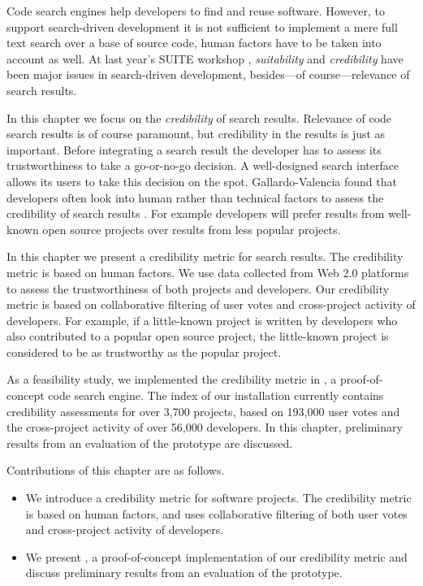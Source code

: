 Code search engines help developers to find and reuse software. However, to support search-driven development it is not sufficient to implement a mere full text search over a base of source code, human factors have to be taken into account as well. At last year's SUITE workshop \cite{Kuhn09a}, \emph{suitability} and \emph{credibility} have been major issues in search-driven development, besides---of course---relevance of search results.  

In this chapter we focus on the \emph{credibility} of search results. Relevance of code search results is of course paramount, but credibility in the results is just as important. Before integrating a search result the developer has to assess its trustworthiness to take a go-or-no-go decision. A well-designed search interface allows its users to take this decision on the spot. Gallardo-Valencia \etal found that developers often look into human rather than technical factors to assess the credibility of search results \cite{Gall09a}. For example developers will prefer results from well-known open source projects over results from less popular projects.

In this chapter we present a credibility metric for search results. The credibility metric is based on human factors. We use data collected from Web 2.0 platforms to assess the trustworthiness of both projects and developers. Our credibility metric is based on collaborative filtering of user votes and cross-project activity of developers. For example, if a little-known project is written by developers who also contributed to a popular open source project, the little-known project is considered to be as trustworthy as the popular project. 

As a feasibility study, we implemented the credibility metric in \Jbd, a proof-of-concept code search engine. The index of our \Jbd installation currently contains credibility assessments for over 3,700 projects, based on 193,000 user votes and the cross-project activity of over 56,000 developers. In this chapter, preliminary results from an evaluation of the prototype are discussed.

Contributions of this chapter are as follows.
\begin{itemize}
\item We introduce a credibility metric for software projects. The credibility metric is based on human factors, and uses collaborative filtering of both user votes and cross-project activity of developers.
\item We present \Jbd, a proof-of-concept implementation of our credibility metric and discuss preliminary results from an evaluation of the prototype.
\end{itemize}

